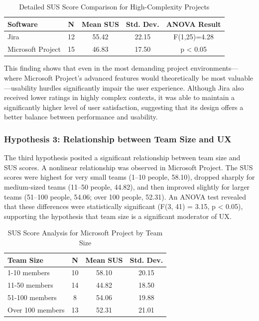 \documentclass[runningheads]{llncs}
\begin{document}
\begin{table}[h]
\caption{Detailed SUS Score Comparison for High-Complexity Projects}
\centering
\begin{tabular}{l c c c c}
\toprule
\textbf{Software} & \textbf{N} & \textbf{Mean SUS} & \textbf{Std. Dev.} & \textbf{ANOVA Result} \\
\midrule
Jira & 12 & 55.42 & 22.15 & F(1,25)=4.28 \\
Microsoft Project & 15 & 46.83 & 17.50 & p < 0.05 \\
\bottomrule
\end{tabular}
\end{table}



This finding shows that even in the most demanding project environments—where Microsoft Project’s advanced features would theoretically be most valuable—usability hurdles significantly impair the user experience. Although Jira also received lower ratings in highly complex contexts, it was able to maintain a significantly higher level of user satisfaction, suggesting that its design offers a better balance between performance and usability.


\subsubsection{Hypothesis 3: Relationship between Team Size and UX}
The third hypothesis posited a significant relationship between team size and SUS scores. A nonlinear relationship was observed in Microsoft Project. The SUS scores were highest for very small teams (1–10 people, 58.10), dropped sharply for medium-sized teams (11–50 people, 44.82), and then improved slightly for larger teams (51–100 people, 54.06; over 100 people, 52.31). An ANOVA test revealed that these differences were statistically significant (F(3, 41) = 3.15, p < 0.05), supporting the hypothesis that team size is a significant moderator of UX.



\begin{table}[h]
\caption{SUS Score Analysis for Microsoft Project by Team Size}
\centering
\begin{tabular}{l c c c}
\toprule
\textbf{Team Size} & \textbf{N} & \textbf{Mean SUS} & \textbf{Std. Dev.} \\
\midrule
1-10 members & 10 & 58.10 & 20.15 \\
11-50 members & 14 & 44.82 & 18.50 \\
51-100 members & 8 & 54.06 & 19.88 \\
Over 100 members & 13 & 52.31 & 21.01 \\
\bottomrule
\end{tabular}
\end{table}
\end{document}
